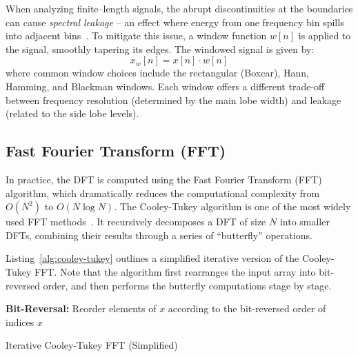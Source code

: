 \documentclass[12pt,letter]{article}
\begin{document}
When analyzing finite--length signals, the abrupt discontinuities at the
boundaries can cause \textit{spectral leakage} -- an effect where energy from
one frequency bin spills into adjacent bins~\citep{smith1997scientist}. To
mitigate this issue, a window function $w[n]$ is applied to the signal,
smoothly tapering its edges. The windowed signal is given by:
\begin{equation}
x_w[n] = x[n] \cdot w[n]
\label{eqn:window}
\end{equation}
where common window choices include the rectangular (Boxcar), Hann, Hamming,
and Blackman windows. Each window offers a different trade-off between
frequency resolution (determined by the main lobe width) and leakage (related
to the side lobe levels).

\subsection{Fast Fourier Transform (FFT)}

In practice, the DFT is computed using the Fast Fourier Transform (FFT)
algorithm, which dramatically reduces the computational complexity from
$O(N^2)$ to $O(N \log N)$. The Cooley-Tukey algorithm is one of the most
widely used FFT methods~\citep{cooley1965algorithm}. It recursively
decomposes a DFT of size $N$ into smaller DFTs, combining their results
through a series of ``butterfly'' operations.

Listing~\ref{alg:cooley-tukey} outlines a simplified iterative version of the
Cooley-Tukey FFT. Note that the algorithm first rearranges the input array
into bit-reversed order, and then performs the butterfly computations stage
by stage.

\begin{algorithm}[H]
\SetAlgoLined
{}
\textbf{Bit-Reversal:} Reorder elements of $x$ according to the bit-reversed order of indices\;
\Return $x$\;
\caption{Iterative Cooley-Tukey FFT (Simplified)}
\label{alg:cooley-tukey}
\end{algorithm}
\end{document}

